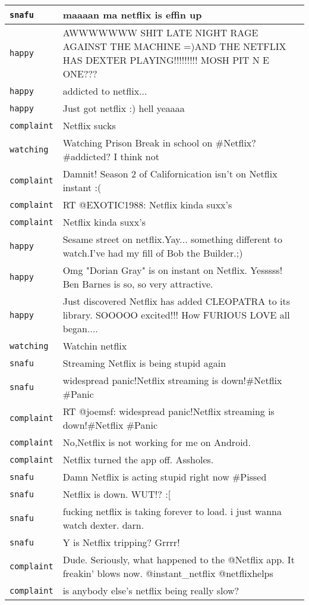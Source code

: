 \begin{center}
\begin{longtable}{|l|p{120mm}|}
      \tabularnewline\hline
         \texttt{snafu} & maaaan ma netflix is effin up
      \tabularnewline\hline
         \texttt{happy} & AWWWWWWW SHIT LATE NIGHT RAGE AGAINST THE MACHINE =)AND THE NETFLIX HAS DEXTER PLAYING!!!!!!!!! MOSH PIT N E ONE???
      \tabularnewline\hline
         \texttt{happy} & addicted to netflix...
      \tabularnewline\hline
         \texttt{happy} & Just got netflix :) hell yeaaaa
      \tabularnewline\hline
         \texttt{complaint} & Netflix sucks
      \tabularnewline\hline
         \texttt{watching} & Watching Prison Break in school on \#Netflix? \#addicted? I think not
      \tabularnewline\hline
         \texttt{complaint} & Damnit! Season 2 of Californication isn't on Netflix instant :(
      \tabularnewline\hline
         \texttt{complaint} & RT @EXOTIC1988: Netflix kinda suxx's
      \tabularnewline\hline
         \texttt{complaint} & Netflix kinda suxx's
      \tabularnewline\hline
         \texttt{happy} & Sesame street on netflix.Yay... something different to watch.I've had my fill of Bob the Builder.;)
      \tabularnewline\hline
         \texttt{happy} & Omg "Dorian Gray" is on instant on Netflix. Yesssss! Ben Barnes is so, so very attractive.
      \tabularnewline\hline
         \texttt{happy} & Just discovered Netflix has added CLEOPATRA to its library. SOOOOO excited!!! How FURIOUS LOVE all began....
      \tabularnewline\hline
         \texttt{watching} & Watchin netflix
      \tabularnewline\hline
         \texttt{snafu} & Streaming Netflix is being stupid again
      \tabularnewline\hline
         \texttt{snafu} & widespread panic!Netflix streaming is down!\#Netflix \#Panic
      \tabularnewline\hline
         \texttt{complaint} & RT @joemsf: widespread panic!Netflix streaming is down!\#Netflix \#Panic
      \tabularnewline\hline
         \texttt{complaint} & No,Netflix is not working for me on Android.
      \tabularnewline\hline
         \texttt{complaint} & Netflix turned the app off. Assholes.
      \tabularnewline\hline
         \texttt{snafu} & Damn Netflix is acting stupid right now \#Pissed
      \tabularnewline\hline
         \texttt{snafu} & Netflix is down. WUT!? :[
      \tabularnewline\hline
         \texttt{snafu} & fucking netflix is taking forever to load. i just wanna watch dexter. darn.
      \tabularnewline\hline
         \texttt{snafu} & Y is Netflix tripping? Grrrr!
      \tabularnewline\hline
         \texttt{complaint} & Dude. Seriously, what happened to the @Netflix app. It freakin' blows now. @instant\_netflix @netflixhelps
      \tabularnewline\hline
         \texttt{complaint} & is anybody else's netflix being really slow?

\end{longtable}
\end{center}
